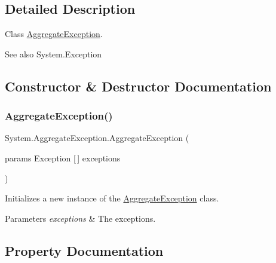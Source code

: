 \subsection{Detailed Description}
Class \hyperlink{class_system_1_1_aggregate_exception}{Aggregate\+Exception}. 

\begin{DoxySeeAlso}{See also}
System.\+Exception


\end{DoxySeeAlso}


\subsection{Constructor \& Destructor Documentation}
\mbox{\label{class_system_1_1_aggregate_exception_a892fba5f00deea7485d2f74ce0784129}} 
\subsubsection{\texorpdfstring{Aggregate\+Exception()}{AggregateException()}}
{\footnotesize\ttfamily System.\+Aggregate\+Exception.\+Aggregate\+Exception (\begin{DoxyParamCaption}\item[{params Exception \mbox{[}$\,$\mbox{]}}]{exceptions }\end{DoxyParamCaption})\hspace{0.3cm}{\ttfamily [inline]}}



Initializes a new instance of the \hyperlink{class_system_1_1_aggregate_exception}{Aggregate\+Exception} class. 


\begin{DoxyParams}{Parameters}
{\em exceptions} & The exceptions.\\
\hline
\end{DoxyParams}


\subsection{Property Documentation}
\mbox{\label{class_system_1_1_aggregate_exception_a295c129a5f0ee297d339315d90ea2860}} 
